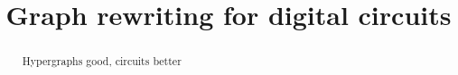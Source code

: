 









\title{Graph rewriting for digital circuits}





    \maketitle

    \begin{abstract}
        Hypergraphs good, circuits better
    \end{abstract}

    
    
    

    
